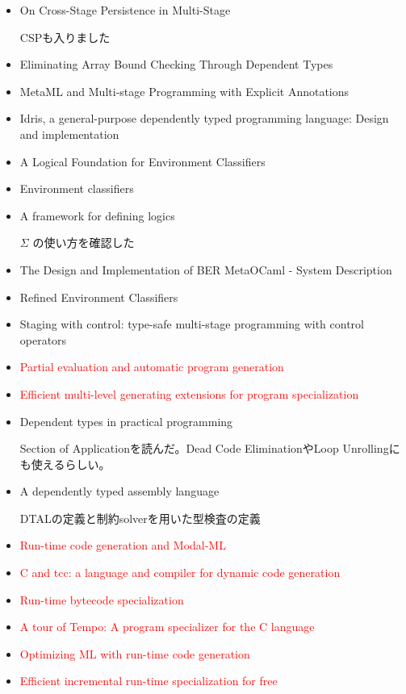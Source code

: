\documentclass[runningheads]{llncs}
\newcommand{\red}[1]{\textcolor{red}{#1 }}
\begin{document}
\begin{itemize}
	\item On Cross-Stage Persistence in Multi-Stage\cite{Hanada2014}
	      
	      CSPも入りました
	\item Eliminating Array Bound Checking Through Dependent Types\cite{Xi98}
	\item MetaML and Multi-stage Programming with Explicit Annotations\cite{MetaML}
	\item Idris, a general-purpose dependently typed programming language: Design and implementation\cite{brady2013idris}
	\item A Logical Foundation for Environment Classifiers\cite{Tsukada}
	\item Environment classifiers\cite{taha2003environment}
	\item A framework for defining logics\cite{harper1993framework}
	      
	      $\Sigma$ の使い方を確認した
	\item The Design and Implementation of {BER} MetaOCaml - System Description\cite{oleg2014}
	\item Refined Environment Classifiers\cite{kiselyov2016refined}
	\item Staging with control: type-safe multi-stage programming with control operators\cite{oishi2017staging}
	\item \red{Partial evaluation and automatic program generation}\cite{jones1993partial}
	\item \red{Efficient multi-level generating extensions for program specialization}\cite{gluck1995efficient}
	\item Dependent types in practical programming\cite{xi1999dependent}
	      
	      Section of Applicationを読んだ。Dead Code EliminationやLoop Unrollingにも使えるらしい。
	      
	\item A dependently typed assembly language\cite{xi2001dependently}
	      
	      DTALの定義と制約solverを用いた型検査の定義
	\item \red{Run-time code generation and Modal-ML}\cite{wickline1998run}
	\item \red{C and tcc: a language and compiler for dynamic code generation}\cite{poletto1999c}
	\item \red{Run-time bytecode specialization}\cite{masuhara2001run}
	\item \red{A tour of Tempo: A program specializer for the C language}\cite{consel2004tour}
	\item \red{Optimizing ML with run-time code generation}\cite{lee1996optimizing}
	\item \red{Efficient incremental run-time specialization for free}\cite{marlet1999efficient}
	      
\end{itemize}
\end{document}
